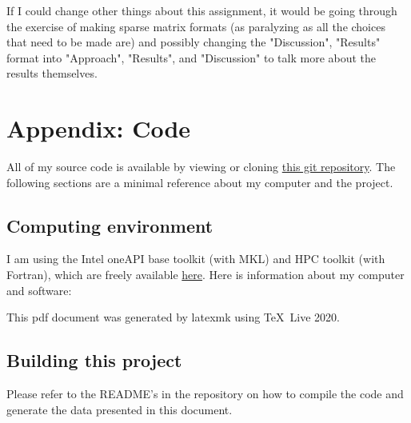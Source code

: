 \documentclass{article}
\begin{document}
If I could change other things about this assignment, it would be
going through the exercise of making sparse matrix formats 
(as paralyzing as all the choices that need to be made are)
and possibly changing the "Discussion", "Results" format into
"Approach", "Results", and "Discussion" to talk more about 
the results themselves.

\newpage

\section{
Appendix: Code
}

All of my source code is available by viewing or cloning
\href{https://github.com/lxvm/ph121c.git}{this git repository}.
The following sections are a minimal reference about my computer
and the project.

\subsection{
Computing environment
}

I am using the Intel oneAPI base toolkit (with MKL)
and HPC toolkit (with Fortran), which are freely available
\href{https://software.intel.com/content/www/us/en/develop/
articles/free-intel-software-developer-tools.html}{here}.
Here is information about my computer and software:



This pdf document was generated by latexmk using \TeX\ Live 2020.

\subsection{
Building this project
}

Please refer to the README's in the repository on how to compile the
code and generate the data presented in this document.
\end{document}
